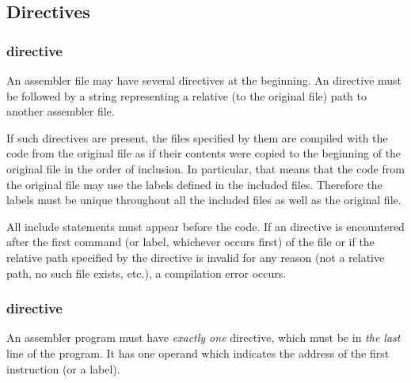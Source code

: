\subsection{Directives}

\subsubsection{ directive}

\vspace{-0.2cm}

An assembler file may have several  directives at the beginning.
An  directive must be followed by a string representing a relative
(to the original file) path to another assembler file.

If such directives are present, the files specified by them are compiled with
the code from the original file as if their contents were copied to
the beginning of the original file in the order of inclusion.
In particular, that means that the code from the original file may use
the labels defined in the included files.
Therefore the labels must be unique throughout all the included files 
as well as the original file.

All include statements must appear before the code.
If an  directive is encountered after the first command
(or label, whichever occurs first) of the file or if the relative path
specified by the directive is invalid for any reason (not a relative path,
no such file exists, etc.), a compilation error occurs.

\vspace{-0.35cm}

\subsubsection{ directive}

\vspace{-0.2cm}

An assembler program must have \textit{exactly one}  directive,
which must be in \textit{the last} line of the program.
It has one operand which indicates the address of the first instruction
(or a label).
